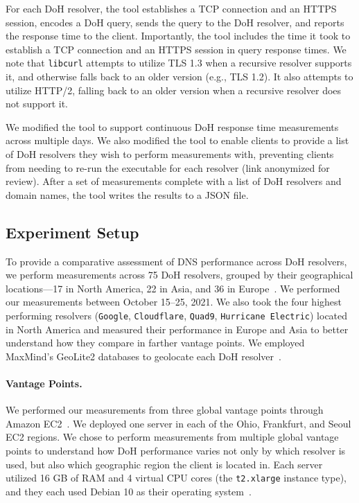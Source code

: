 For each DoH resolver, the tool establishes a TCP connection and an HTTPS session,
encodes a DoH query, sends the query to the DoH resolver, and reports the
response time to the client.  Importantly, the tool includes the time it took
to establish a TCP connection and an HTTPS session in query response times.
We note that \texttt{libcurl} attempts to utilize TLS 1.3 when a recursive
resolver supports it, and otherwise falls back to an older version
(e.g., TLS 1.2).
It also attempts to utilize HTTP/2, falling back to an older version when a
recursive resolver does not support it.

We modified the tool to support continuous DoH response time measurements
across multiple days.  We also modified the tool to enable clients to provide
a list of DoH resolvers they wish to perform measurements with, preventing
clients from needing to re-run the executable for each resolver (link
anonymized for review).  After a set of measurements complete with a list of
DoH resolvers and domain names, the tool writes the results to a JSON file.

\subsection{Experiment Setup} To provide a comparative assessment of DNS
performance across DoH resolvers, we perform measurements across 75 DoH
resolvers, grouped by their geographical locations—17 in North America, 22 in
Asia, and 36 in Europe~\cite{dnscrypt}.  We performed our measurements between
October 15--25, 2021.  We also took the four highest
performing resolvers (\texttt{Google}, \texttt{Cloudflare}, \texttt{Quad9},
\texttt{Hurricane Electric}) located in North America and measured their
performance in Europe and Asia to better understand how they compare in
farther vantage points.  We employed MaxMind's GeoLite2 databases to geolocate
each DoH resolver~\cite{maxmind}.

\paragraph{Vantage Points.} We performed our measurements from three global
vantage points through Amazon EC2~\cite{amazon_ec2}.  We deployed one server
in each of the Ohio, Frankfurt, and Seoul EC2 regions.  We chose to perform
measurements from multiple global vantage points to understand how DoH
performance varies not only by which resolver is used, but also which
geographic region the client is located in.  Each server utilized 16 GB of RAM
and 4 virtual CPU cores (the \texttt{t2.xlarge} instance type), and they each
used Debian 10 as their operating system~\cite{amazon_ec2_instance_types}.


